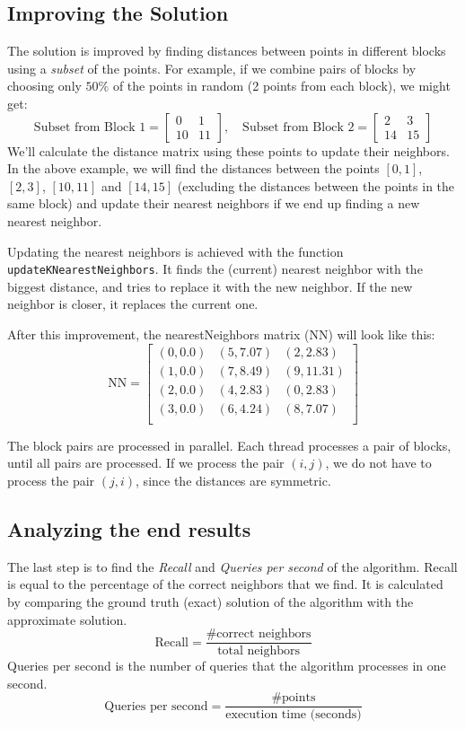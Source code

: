 \documentclass{article}
\begin{document}
\subsection{Improving the Solution}
The solution is improved by finding distances between points in different blocks using a \emph{subset} of the points. 
For example, if we combine pairs of blocks by choosing only $50\%$ of the points in random (2 points from each block),
we might get:
\[
\text{Subset from Block 1} = \begin{bmatrix}
0 & 1 \\
10 & 11
\end{bmatrix}, \quad
\text{Subset from Block 2} = \begin{bmatrix}
2 & 3 \\
14 & 15
\end{bmatrix}
\]
We'll calculate the distance matrix using these points to update their neighbors. In the above example, we will find the
distances between the points $[0, 1]$, $[2, 3]$, $[10, 11]$ and $[14, 15]$ (excluding the distances between the points in the same block) and update their nearest neighbors if we end up finding a new
nearest neighbor.

Updating the nearest neighbors is achieved with the function \texttt{updateKNearestNeighbors}. It finds the (current) nearest neighbor with
the biggest distance, and tries to replace it with the new neighbor. If the new neighbor is closer, it replaces the current one.

After this improvement, the nearestNeighbors matrix (NN) will look like this:
\[
\text{NN} = \begin{bmatrix}
(0, 0.0) & (5, 7.07) & (2, 2.83) \\
(1, 0.0) & (7, 8.49) & (9, 11.31) \\
(2, 0.0) & (4, 2.83) & (0, 2.83) \\
(3, 0.0) & (6, 4.24) & (8, 7.07) \\
\end{bmatrix}
\]

The block pairs are processed in parallel. Each thread processes a pair of blocks, until all pairs are processed.
If we process the pair $(i, j)$, we do not have to process the pair $(j, i)$, since the distances are symmetric.

\subsection{Analyzing the end results}
The last step is to find the \emph{Recall} and \emph{Queries per second} of the algorithm. Recall is equal to the percentage of the
correct neighbors that we find. It is calculated by comparing the ground truth (exact) solution of the algorithm with the 
approximate solution.
\[
\text{Recall} = \frac{\text{\# correct neighbors}}{\text{total neighbors}}
\]
Queries per second is the number of queries that the algorithm processes in one second. 
\[
\text{Queries per second} = \frac{\text{\# points}}{\text{execution time (seconds)}}
\]
\end{document}
